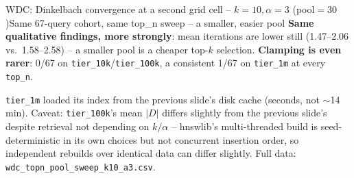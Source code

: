 \documentclass[aspectratio=169,10pt]{beamer}
\newcommand{\highlight}[1]{{\color{Cat1}\bfseries #1}}
\begin{document}
\begin{frame}{WDC: Dinkelbach convergence at a second grid cell -- $k{=}10,\alpha{=}3$ (pool$=30$)}{Same 67-query cohort, same top\_n sweep -- a smaller, easier pool}
\vspace{3pt}
\footnotesize
\highlight{Same qualitative findings, more strongly}: mean iterations are lower still (1.47--2.06 vs.\ 1.58--2.58) -- a smaller pool is a cheaper top-$k$ selection. \highlight{Clamping is even rarer}: 0/67 on \texttt{tier\_10k}/\texttt{tier\_100k}, a consistent 1/67 on \texttt{tier\_1m} at every \texttt{top\_n}.

\vspace{1pt}
{\footnotesize\color{Muted} \texttt{tier\_1m} loaded its index from the previous slide's disk cache (seconds, not $\sim$14\,min). Caveat: \texttt{tier\_100k}'s mean $|D|$ differs slightly from the previous slide's despite retrieval not depending on $k/\alpha$ -- hnswlib's multi-threaded build is seed-deterministic in its own choices but not concurrent insertion order, so independent rebuilds over identical data can differ slightly. Full data: \texttt{wdc\_topn\_pool\_sweep\_k10\_a3.csv}.}
\end{frame}
\end{document}
